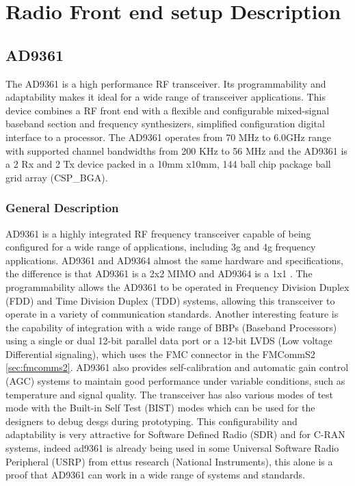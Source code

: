 \chapter{Radio Front end setup Description}
\section{AD9361}

The AD9361 is a high performance RF transceiver. Its programmability and adaptability makes it ideal for a wide range of transceiver applications. This device combines a RF front end with a flexible and configurable mixed-signal baseband section and frequency synthesizers, simplified configuration digital interface to a processor. 
The AD9361 operates from 70 MHz to 6.0GHz range with supported channel bandwidths from 200 KHz to 56 MHz and the AD9361 is a 2 Rx and 2 Tx device packed in a 10mm x10mm, 144 ball chip package ball grid array (CSP\_BGA).

\subsection{General Description}

AD9361 is a highly integrated RF frequency transceiver capable of being configured for a wide range of applications, including 3g and 4g frequency applications. AD9361 and AD9364 almost the same hardware and specifications, the difference is that AD9361 is a 2x2 MIMO and AD9364 is a 1x1 \cite{ad9361_wiki}.
The programmability allows the AD9361 to be operated in Frequency Division Duplex (FDD) and Time Division Duplex (TDD) systems, allowing this transceiver to operate in a variety of communication standards. Another interesting feature is the capability of integration with a wide range of BBPs (Baseband Processors) using a single or dual 12-bit parallel data port or a 12-bit LVDS (Low voltage Differential signaling), which uses the FMC connector in the FMCommS2 \ref{sec:fmcomms2}.
AD9361 also provides self-calibration and automatic gain control (AGC) systems to maintain good performance under variable conditions, such as temperature and signal quality. The transceiver has also various modes of test mode with the Built-in Self Test (BIST) modes which can be used for the designers to debug desgs during prototyping.
This configurability and adaptability is very attractive for Software Defined Radio (SDR) and for C-RAN systems, indeed ad9361 is already being used in some Universal Software Radio Peripheral (USRP) from ettus research (National Instruments), this alone is a proof that AD9361 can work in a wide range of systems and standards.

